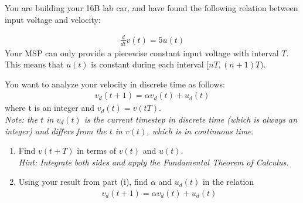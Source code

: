 
You are building your 16B lab car, and have found the following relation between input voltage and velocity:

\begin{align*}
    \frac{d}{dt} v(t) = 5u(t)
\end{align*}
Your MSP can only provide a piecewise constant input voltage with interval $T$. This means that $u(t)$ is constant during each interval $[nT,(n+1)T)$.

\begin{enumerate}
    \qitem You want to analyze your velocity in discrete time as follows:
    \begin{align*}
        v_d(t + 1) = \alpha v_d(t) + u_d(t)
    \end{align*}
    where t is an integer and $v_d(t) = v(tT)$. \\
    \textit{Note: the $t$ in $v_d(t)$ is the current timestep in discrete time (which is always an integer) and differs from the $t$ in $v(t)$, which is in continuous time.}
    \begin{enumerate}[label=(\roman*)]
        \item Find $v(t + T)$ in terms of $v(t)$ and $u(t)$. \\
        \textit{Hint: Integrate both sides and apply the Fundamental Theorem of Calculus.}


        \item Using your result from part (i), find $\alpha$ and $u_d(t)$ in the relation
        \begin{align*}
            v_d(t + 1) = \alpha v_d(t) + u_d(t)
        \end{align*}
    \end{enumerate}


\end{enumerate}
